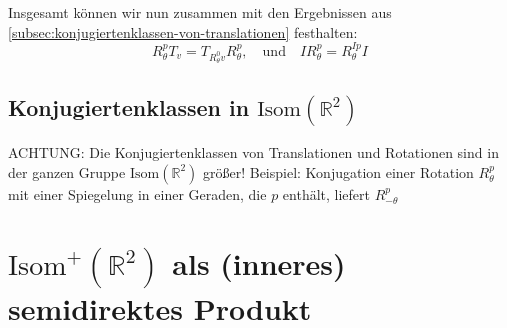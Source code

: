 \documentclass[a4paper, ngerman]{article}
\numberwithin{equation}{chapter}
\theoremstyle{plain}
\theoremstyle{definition}
\newcommand{\geradisometr}{\ensuremath{\mathrm{Isom}^+(\mathbb R^2)}}
\newcommand{\anm}[1]{{\color{red} #1}}
\begin{document}
Insgesamt können wir nun zusammen mit den Ergebnissen aus \cref{subsec:konjugiertenklassen-von-translationen} festhalten:
\begin{equation}\label{eq:konjugations-relationen}
    R_\theta^p T_v = T_{R_\theta^0 v} R_\theta^p, \quad \text{und} \quad IR_\theta^p = R_\theta^{Ip}I
\end{equation}

\subsection{Konjugiertenklassen in \(\mathrm{Isom}(\mathbb R^2)\)}
ACHTUNG: Die Konjugiertenklassen von Translationen und Rotationen sind in der ganzen Gruppe \(\mathrm{Isom}(\mathbb R^2)\) größer! \anm{Beispiel: Konjugation einer Rotation \(R_\theta^p\) mit einer Spiegelung in einer Geraden, die \(p\) enthält, liefert \(R_{-\theta}^p\)}

\section{\(\geradisometr\) als (inneres) semidirektes Produkt}
\end{document}
